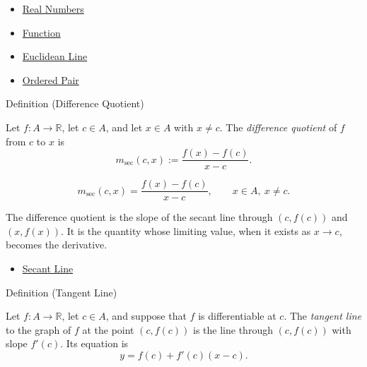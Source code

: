 \begin{dependencies}
\begin{itemize}
  \item \hyperref[def:reals]{Real Numbers}
  \item \hyperref[def:function]{Function}
  \item \hyperref[def:euclid-line]{Euclidean Line}
  \item \hyperref[def:ordered-pair]{Ordered Pair}
\end{itemize}
\end{dependencies}


\begin{definitionbox}{Definition (Difference Quotient)}
\begin{definition}
\label{def:difference-quotient}
Let $f:A\to\mathbb{R}$, let $c\in A$, and let $x\in A$ with $x\neq c$. The \emph{difference quotient} of $f$ from $c$ to $x$ is
\[
  m_{\sec}(c,x)
  :=
  \frac{f(x)-f(c)}{x-c}.
\]
\end{definition}
\end{definitionbox}

\begin{remark*}
\[
m_{\sec}(c,x)=\frac{f(x)-f(c)}{x-c},
\qquad x\in A,\ x\neq c.
\]
\end{remark*}

\begin{remark*}[Interpretation]
The difference quotient is the slope of the secant line through $(c,f(c))$ and $(x,f(x))$. It is the quantity whose limiting value, when it exists as $x\to c$, becomes the derivative.
\end{remark*}

\begin{dependencies}
\begin{itemize}
  \item \hyperref[def:secant-line]{Secant Line}
\end{itemize}
\end{dependencies}


\begin{definitionbox}{Definition (Tangent Line)}
\begin{definition}
\label{def:tangent-line}
Let $f : A \to \mathbb{R}$, let $c \in A$, and suppose that $f$ is differentiable at $c$. The \emph{tangent line} to the graph of $f$ at the point $(c, f(c))$ is the line through $(c, f(c))$ with slope $f'(c)$. Its equation is
\[
y = f(c) + f'(c)(x - c).
\]
\end{definition}
\end{definitionbox}

